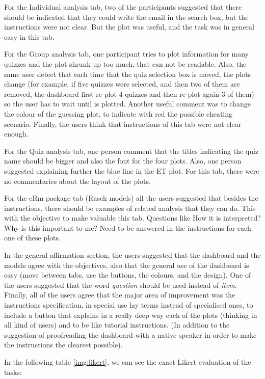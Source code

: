 For the Individual analysis tab, two of the participants suggested that there should be indicated that they could write the email in the search box, but the instructions were not clear. But the plot was useful, and the task was in general easy in this tab.

For the Group analysis tab, one participant tries to plot information for many quizzes and the plot shrunk up too much, that can not be readable. Also, the same user detect that each time that the quiz selection box is moved, the plots change (for example, if five quizzes were selected, and then two of them are removed, the dashboard first re-plot 4 quizzes and then re-plot again 3 of them) so the user has to wait until is plotted. Another useful comment was to change the colour of the guessing plot, to indicate with red the possible cheating scenario. Finally, the users think that instructions of this tab were not clear enough.

For the Quiz analysis tab, one person comment that the titles indicating the quiz name should be bigger and also the font for the four plots. Also, one person suggested explaining further the blue line in the ET plot. For this tab, there were no commentaries about the layout of the plots.

For the eRm package tab (Rasch models) all the users suggested that besides the instructions, there should be examples of related analysis that they can do. This with the objective to make valuable this tab. Questions like How it is interpreted? Why is this important to me?
Need to be answered in the instructions for each one of these plots.

In the general affirmation section, the users suggested that the dashboard and the models agree with the objectives, also that the general use of the dashboard is easy (move between tabs, use the buttons, the colours, and the design). One of the users suggested that the word \textit{question} should be used instead of \textit{item}. Finally, all of the users agree that the major area of improvement was the instructions specification, in special use lay terms instead of specialised ones, to include a button that explains in a really deep way each of the plots (thinking in all kind of users) and to be like tutorial instructions. (In addition to the suggestion of proofreading the dashboard with a native speaker in order to make the instructions the clearest possible).

In the following table \cref{img:likert}, we can see the exact Likert evaluation of the tasks:

